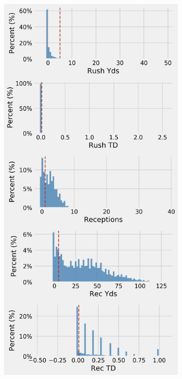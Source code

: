 \documentclass[12pt]{article}
\begin{document}
\pagebreak
\begin{figure}[H]
  \centering
  \begin{subfigure}[b]{0.450\textwidth}
    \centering
    \includegraphics[width=1\textwidth]{../figures/no_threshold_hist_WR}

\end{subfigure}
\end{figure}
\end{document}

